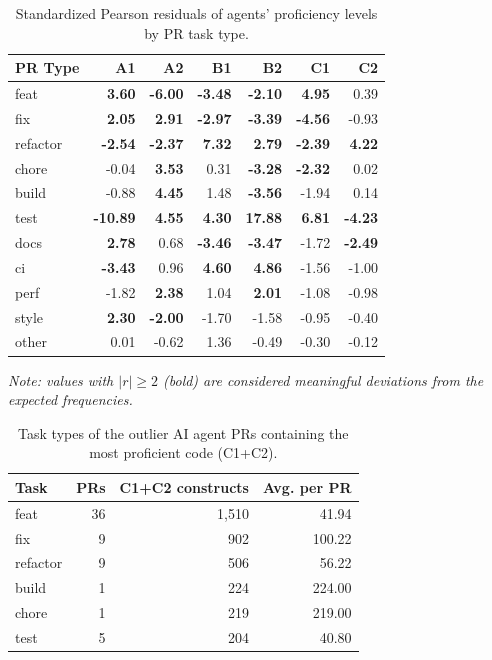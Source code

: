 \begin{table}[t]
\centering
\caption{Standardized Pearson residuals of agents' proficiency levels by PR task type.}
\label{tab:rq1-residuals}
\begin{tabular}{lrrrrrr}
\toprule
PR Type & A1 & A2 & B1 & B2 & C1 & C2 \\
\midrule
feat & \textbf{3.60} & \textbf{-6.00} & \textbf{-3.48} & \textbf{-2.10} & \textbf{4.95} & 0.39 \\
fix & \textbf{2.05} & \textbf{2.91} & \textbf{-2.97} & \textbf{-3.39} & \textbf{-4.56} & -0.93 \\
refactor & \textbf{-2.54} & \textbf{-2.37} & \textbf{7.32} & \textbf{2.79} & \textbf{-2.39} & \textbf{4.22} \\
chore & -0.04 & \textbf{3.53} & 0.31 & \textbf{-3.28} & \textbf{-2.32} & 0.02 \\
build & -0.88 & \textbf{4.45} & 1.48 & \textbf{-3.56} & -1.94 & 0.14 \\
test & \textbf{-10.89} & \textbf{4.55} & \textbf{4.30} & \textbf{17.88} & \textbf{6.81} & \textbf{-4.23} \\
docs & \textbf{2.78} & 0.68 & \textbf{-3.46} & \textbf{-3.47} & -1.72 & \textbf{-2.49} \\
ci & \textbf{-3.43} & 0.96 & \textbf{4.60} & \textbf{4.86} & -1.56 & -1.00 \\
perf & -1.82 & \textbf{2.38} & 1.04 & \textbf{2.01} & -1.08 & -0.98 \\
style & \textbf{2.30} & \textbf{-2.00} & -1.70 & -1.58 & -0.95 & -0.40 \\
other & 0.01 & -0.62 & 1.36 & -0.49 & -0.30 & -0.12 \\
\bottomrule
\end{tabular}
\small\textit{Note: values with $|r| \geq 2$ (bold) are considered meaningful deviations from the expected frequencies.}
\end{table}


\begin{table}[t]
\centering
\caption{Task types of the outlier AI agent PRs containing the most proficient code (C1+C2).}
\label{tab:rq3-outliers}
\begin{tabular}{lrrr}
\toprule
Task & PRs & C1+C2 constructs & Avg. per PR \\
\midrule
feat & 36 & 1,510 & 41.94 \\
fix & 9 & 902 & 100.22 \\
refactor & 9 & 506 & 56.22 \\
build & 1 & 224 & 224.00 \\
chore & 1 & 219 & 219.00 \\
test & 5 & 204 & 40.80 \\
\bottomrule
\end{tabular}
\end{table}
